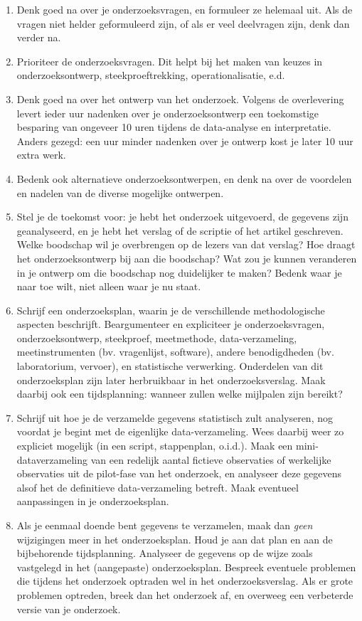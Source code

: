 \documentclass[
]{book}
\begin{document}
\begin{enumerate}
\def\labelenumi{\arabic{enumi}.}
\item
  Denk goed na over je onderzoeksvragen, en formuleer ze helemaal uit.
  Als de vragen niet helder geformuleerd zijn, of als er veel
  deelvragen zijn, denk dan verder na.
\item
  Prioriteer de onderzoeksvragen. Dit helpt bij het maken van keuzes
  in onderzoeksontwerp, steekproeftrekking, operationalisatie, e.d.
\item
  Denk goed na over het ontwerp van het onderzoek. Volgens de
  overlevering levert ieder uur nadenken over je onderzoeksontwerp een
  toekomstige besparing van ongeveer 10 uren tijdens de data-analyse
  en interpretatie. Anders gezegd: een uur minder nadenken over je
  ontwerp kost je later 10 uur extra werk.
\item
  Bedenk ook alternatieve onderzoeksontwerpen, en denk na over de
  voordelen en nadelen van de diverse mogelijke ontwerpen.
\item
  Stel je de toekomst voor: je hebt het onderzoek uitgevoerd, de
  gegevens zijn geanalyseerd, en je hebt het verslag of de scriptie of
  het artikel geschreven. Welke boodschap wil je overbrengen op de
  lezers van dat verslag? Hoe draagt het onderzoeksontwerp bij aan die
  boodschap? Wat zou je kunnen veranderen in je ontwerp om die
  boodschap nog duidelijker te maken? Bedenk waar je naar toe wilt,
  niet alleen waar je nu staat.
\item
  Schrijf een onderzoeksplan, waarin je de verschillende
  methodologische aspecten beschrijft. Beargumenteer en expliciteer je
  onderzoeksvragen, onderzoeksontwerp, steekproef, meetmethode,
  data-verzameling, meetinstrumenten (bv. vragenlijst, software),
  andere benodigdheden (bv. laboratorium, vervoer), en statistische
  verwerking. Onderdelen van dit onderzoeksplan zijn later
  herbruikbaar in het onderzoeksverslag. Maak daarbij ook een
  tijdsplanning: wanneer zullen welke mijlpalen zijn bereikt?
\item
  Schrijf uit hoe je de verzamelde gegevens statistisch zult
  analyseren, nog voordat je begint met de eigenlijke
  data-verzameling. Wees daarbij weer zo expliciet mogelijk (in een
  script, stappenplan, o.i.d.). Maak een mini-dataverzameling van een
  redelijk aantal fictieve observaties of werkelijke observaties uit
  de pilot-fase van het onderzoek, en analyseer deze gegevens alsof
  het de definitieve data-verzameling betreft. Maak eventueel
  aanpassingen in je onderzoeksplan.
\item
  Als je eenmaal doende bent gegevens te verzamelen, maak dan \emph{geen}
  wijzigingen meer in het onderzoeksplan. Houd je aan dat plan en aan
  de bijbehorende tijdsplanning. Analyseer de gegevens op de wijze
  zoals vastgelegd in het (aangepaste) onderzoeksplan. Bespreek
  eventuele problemen die tijdens het onderzoek optraden wel in het
  onderzoeksverslag. Als er grote problemen optreden, breek dan het
  onderzoek af, en overweeg een verbeterde versie van je onderzoek.
\end{enumerate}
\end{document}
